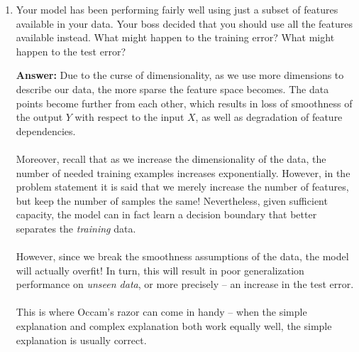 \documentclass{article}
\newenvironment{QandA}{\begin{enumerate}[label=\arabic*.]}{\end{enumerate}}
\newenvironment{answer}{\par\normalfont \textbf{Answer:}}{}
\begin{document}
\begin{QandA}
    \item Your model has been performing fairly well using just a subset of features available in your data. Your boss decided that you should use all the features available instead. What might happen to the training error? What might happen to the test error?
    \begin{answer}
         Due to the curse of dimensionality, as we use more dimensions to describe our data, the more sparse the feature space becomes. The data points become further from each other, which results in loss of smoothness of the output $Y$ with respect to the input $X$, as well as degradation of feature dependencies. \\\\
         Moreover, recall that as we increase the dimensionality of the data, the number of needed training examples increases exponentially. However, in the problem statement it is said that we merely increase the number of features, but keep the number of samples the same! Nevertheless, given sufficient capacity, the model can in fact learn a decision boundary that better separates the \textit{training} data. \\\\
         However, since we break the smoothness assumptions of the data, the model will actually overfit! In turn, this will result in poor generalization performance on \textit{unseen data}, or more precisely -- an increase in the test error.\\\\
         This is where Occam's razor can come in handy -- when the simple explanation and complex explanation both work equally well, the simple explanation is usually correct.
    \end{answer}
\end{QandA}
\end{document}
